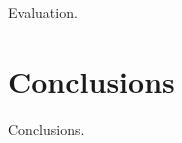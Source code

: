 \documentclass[twocolumn, 10pt, conference]{IEEEtran}
\begin{document}

Evaluation.

\section{Conclusions}
\label{sec:conclusions}



Conclusions.






\end{document}
